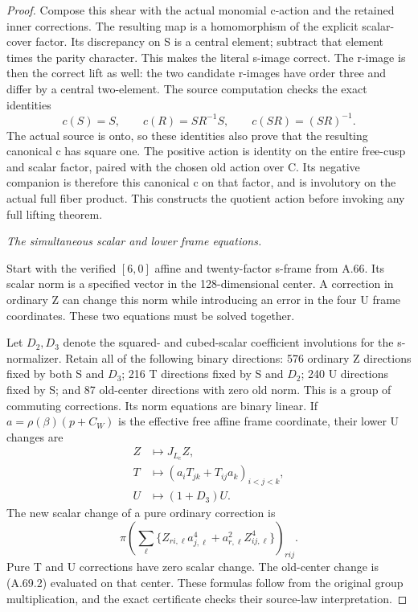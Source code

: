\begin{proof}
Compose this shear with the actual monomial c-action and the
retained inner corrections. The resulting map is a homomorphism
of the explicit scalar-cover factor. Its discrepancy on S is a
central element; subtract that element times the parity character.
This makes the literal s-image correct. The r-image is then the
correct lift as well: the two candidate r-images have order three
and differ by a central two-element. The source computation
checks the exact identities
\[
 c(S)=S,\qquad c(R)=SR^{-1}S,
 \qquad c(SR)=(SR)^{-1}.
 \tag{A.69.3}
\]
The actual source is onto, so these identities also prove that
the resulting canonical c has square one. The positive action
is identity on the entire free-cusp and scalar factor, paired
with the chosen old action over C. Its negative companion is
therefore this canonical c on that factor, and is involutory
on the actual full fiber product. This constructs the quotient
action before invoking any full lifting theorem.

\emph{The simultaneous scalar and lower frame equations.}\par
Start with the verified \([6,0]\) affine and twenty-factor
s-frame from A.66. Its scalar norm is a specified vector in
the 128-dimensional center. A correction in ordinary Z can
change this norm while introducing an error in the four U
frame coordinates. These two equations must be solved together.

Let \(D_2,D_3\) denote the squared- and cubed-scalar coefficient
involutions for the s-normalizer. Retain all of the following
binary directions: 576 ordinary Z directions fixed by both S
and \(D_3\); 216 T directions fixed by S and \(D_2\);
240 U directions fixed by S; and 87 old-center directions with
zero old norm. This is a group of commuting corrections.
Its norm equations are binary linear. If
\(a=\rho(\beta)(p+C_W)\) is the effective free affine frame
coordinate, their lower U changes are
\[
 \begin{aligned}
 Z&\longmapsto J_{L_c}Z,\\
 T&\longmapsto
       (a_iT_{jk}+T_{ij}a_k)_{i<j<k},\\
 U&\longmapsto(1+D_3)U.
 \end{aligned}
 \tag{A.69.4}
\]
The new scalar change of a pure ordinary correction is
\[
 \pi\left(
  \sum_\ell
    \{Z_{ri,\ell}a_{j,\ell}^4
       +a_{r,\ell}^2Z_{ij,\ell}^4\}
       \right)_{rij}.
 \tag{A.69.5}
\]
Pure T and U corrections have zero scalar change. The old-center
change is (A.69.2) evaluated on that center. These formulas follow
from the original group multiplication, and the exact certificate
checks their source-law interpretation.


\end{proof}
